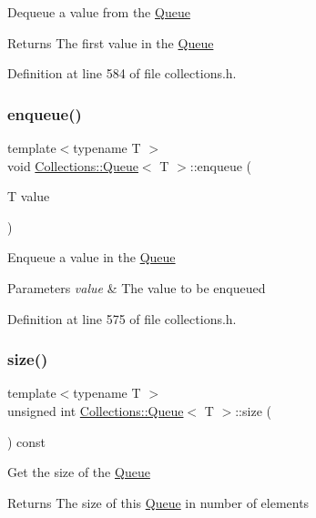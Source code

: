 Dequeue a value from the \hyperlink{class_collections_1_1_queue}{Queue} \begin{DoxyReturn}{Returns}
The first value in the \hyperlink{class_collections_1_1_queue}{Queue} 
\end{DoxyReturn}


Definition at line 584 of file collections.\+h.

\hypertarget{class_collections_1_1_queue_adf0213798edce1d9f823991cd0cd7657}{}\label{class_collections_1_1_queue_adf0213798edce1d9f823991cd0cd7657} 
\subsubsection{\texorpdfstring{enqueue()}{enqueue()}}
{\footnotesize\ttfamily template$<$typename T $>$ \\
void \hyperlink{class_collections_1_1_queue}{Collections\+::\+Queue}$<$ T $>$\+::enqueue (\begin{DoxyParamCaption}\item[{T}]{value }\end{DoxyParamCaption})}

Enqueue a value in the \hyperlink{class_collections_1_1_queue}{Queue} 
\begin{DoxyParams}{Parameters}
{\em value} & The value to be enqueued \\
\hline
\end{DoxyParams}


Definition at line 575 of file collections.\+h.

\hypertarget{class_collections_1_1_queue_a6fc286064fd7c5b6905a352f525f040b}{}\label{class_collections_1_1_queue_a6fc286064fd7c5b6905a352f525f040b} 
\subsubsection{\texorpdfstring{size()}{size()}}
{\footnotesize\ttfamily template$<$typename T $>$ \\
unsigned int \hyperlink{class_collections_1_1_queue}{Collections\+::\+Queue}$<$ T $>$\+::size (\begin{DoxyParamCaption}{ }\end{DoxyParamCaption}) const}

Get the size of the \hyperlink{class_collections_1_1_queue}{Queue} \begin{DoxyReturn}{Returns}
The size of this \hyperlink{class_collections_1_1_queue}{Queue} in number of elements 
\end{DoxyReturn}


